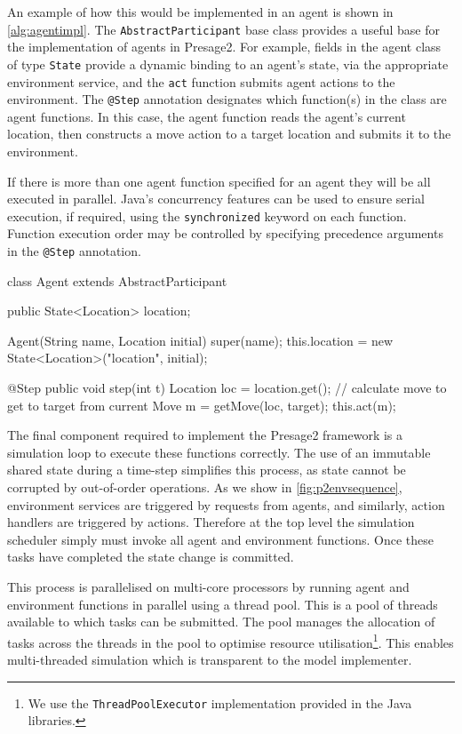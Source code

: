 An example of how this would be implemented in an agent is shown in
\autoref{alg:agentimpl}. The \texttt{AbstractParticipant} base class provides
a useful base for the implementation of agents in Presage2. For example,
fields in the agent class of type \texttt{State} provide a dynamic binding to
an agent's state, via the appropriate environment service, and the
\texttt{act} function submits agent actions to the environment. The
\texttt{@Step} annotation designates which function(s) in the class are agent
functions. In this case, the agent function reads the agent's current
location, then constructs a move action to a target location and submits it to
the environment.

If there is more than one agent function specified for an agent they will be
all executed in parallel. Java's concurrency features can be used to ensure
serial execution, if required, using the \texttt{synchronized} keyword on each
function. Function execution order may be controlled by specifying precedence
arguments in the \texttt{@Step} annotation.

\begin{java}[caption={Presage2 agent implementation},label=alg:agentimpl]
class Agent extends AbstractParticipant {
	public State<Location> location;

	Agent(String name, Location initial) {
		super(name);
		this.location = new State<Location>("location", initial);
	}

	@Step
	public void step(int t) {
		Location loc = location.get();
		// calculate move to get to target from current
		Move m = getMove(loc, target);
		this.act(m);
	}
}
\end{java}

The final component required to implement the Presage2 framework is a
simulation loop to execute these functions correctly. The use of an immutable
shared state during a time-step simplifies this process, as state cannot be
corrupted by out-of-order operations. As we show in
\autoref{fig:p2envsequence}, environment services are triggered by requests
from agents, and similarly, action handlers are triggered by actions.
Therefore at the top level the simulation scheduler simply must invoke all
agent and environment functions. Once these tasks have completed the state
change is committed.

This process is parallelised on multi-core processors by running agent and
environment functions in parallel using a thread pool. This is a pool of
threads available to which tasks can be submitted. The pool manages the
allocation of tasks across the threads in the pool to optimise resource
utilisation\footnote{We use the \texttt{ThreadPoolExecutor} implementation
provided in the Java libraries.}. This enables multi-threaded simulation which
is transparent to the model implementer.

